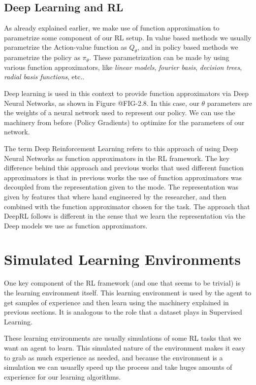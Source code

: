 \figRlPolicyGradientsIntuition

\subsection{Deep Learning and RL}

As already explained earlier, we make use of function approximation to parametrize
some component of our RL setup. In value based methods we usually parametrize the
Action-value function as $Q_{\theta}$, and in policy based methods we parametrize
the policy as $\pi_{\theta}$. These parametrization can be made by using various
function approximators, like \textit{linear models}, \textit{fourier basis}, 
\textit{decision trees}, \textit{radial basis functions}, etc..

Deep learning is used in this context to provide function approximators via Deep
Neural Networks, as shown in Figure @FIG-2.8. In this case, our $\theta$ parameters are the weights of a neural
network used to represent our policy. We can use the machinery from before (Policy Gradients)
to optimize for the parameters of our network.

\figRlPolicyParametrization

The term Deep Reinforcement Learning refers to this approach of using Deep Neural Networks
as function approximators in the RL framework. The key difference behind this approach
and previous works that used different function approximators is that in previous works
the use of function approximators was decoupled from the representation given to the mode.
The representation was given by features that where hand engineered by the researcher, and then
combined with the function approximator chosen for the task. The approach that DeepRL follows is 
different in the sense that we learn the representation via the Deep models we use as function approximators.

\section{Simulated Learning Environments}

One key component of the RL framework (and one that seems to be trivial) is the learning
environment itself. This learning environment is used by the agent to get samples of
experience and then learn using the machinery explained in previous sections. It is analogous
to the role that a dataset plays in Supervised Learning.

These learning environments are usually simulations of some RL tasks that we want an
agent to learn. This simulated nature of the environment makes it easy to grab as much 
experience as needed, and because the environment is a simulation we can usuarlly
speed up the process and take huges amounts of experience for our learning algorithms.

